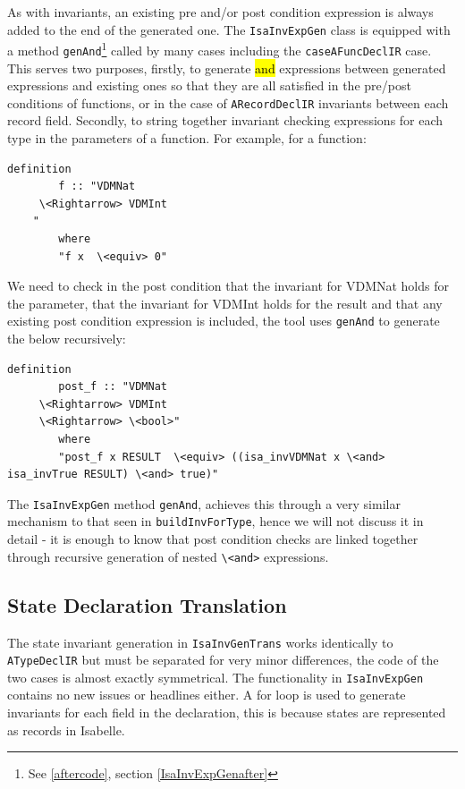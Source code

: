 	As with invariants, an existing pre and/or post condition expression is always added to the end of the generated one. The \lstinline[language=Java]{IsaInvExpGen} class is equipped with a method \lstinline[language=Java]{genAnd}\footnote{See \ref{aftercode}, section \ref{IsaInvExpGenafter}} called by many cases including the \lstinline[language=Java]{caseAFuncDeclIR} case. This serves two purposes, firstly, to generate \ttfamily \hl{and} \rmfamily expressions between generated expressions and existing ones so that they are all satisfied in the pre/post conditions of functions, or in the case of \lstinline[language=Java]{ARecordDeclIR} invariants between each record field. Secondly, to string together invariant checking expressions for each type in the parameters of a function. For example, for a function:
	\begin{lstlisting}[language=Isabelle, mathescape]
	definition
		f :: "VDMNat
	 \<Rightarrow> VDMInt
	"
	    where
	    "f x  \<equiv> 0"
	\end{lstlisting}
	We need to check in the post condition that the invariant for VDMNat holds for the parameter, that the invariant for VDMInt holds for the result and that any existing post condition expression is included, the tool uses \lstinline[language=Java]{genAnd} to generate the below recursively:
	\begin{lstlisting}[language=Isabelle, mathescape]
	definition
		post_f :: "VDMNat
	 \<Rightarrow> VDMInt
	 \<Rightarrow> \<bool>"
	    where
	    "post_f x RESULT  \<equiv> ((isa_invVDMNat x \<and> isa_invTrue RESULT) \<and> true)"

	\end{lstlisting}
	The \lstinline[language=Java]{IsaInvExpGen} method \lstinline[language=Java]{genAnd}, achieves this through a very similar mechanism to that seen in \lstinline[language=Java]{buildInvForType}, hence we will not discuss it in detail - it is enough to know that post condition checks are linked together through recursive generation of nested \lstinline[language=Isabelle, mathescape]{\<and>} expressions.

	\subsection{State Declaration Translation}
	The state invariant generation in \lstinline[language=Java]{IsaInvGenTrans} works identically to \lstinline[language=Java]{ATypeDeclIR} but must be separated for very minor differences, the code of the two cases is almost exactly symmetrical. The functionality in \lstinline[language=Java]{IsaInvExpGen} contains no new issues or headlines either. A for loop is used to generate invariants for each field in the declaration, this is because states are represented as records in Isabelle. 

